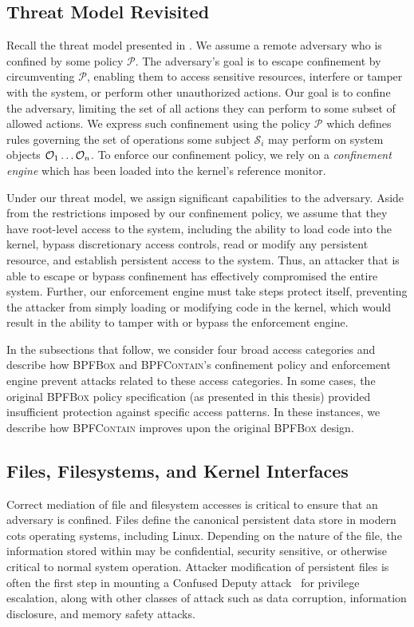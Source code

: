 \documentclass[
  fontsize=12pt,
  titlepage=firstiscover,
  paper=letter,
oneside,
  cleardoublepage=plain,
  parskip=half-,
  DIV=10,
  parindent,
  appendixprefix,
  chapterprefix,
  listof=totoc,
]{scrbook}
\newcommand{\bpfbox}{\textsc{BPFBox}}
\newcommand{\bpfcontain}{\textsc{BPFContain}}
\begin{document}
\subsection{Threat Model Revisited}

Recall the threat model presented in . We assume a remote
adversary who is confined by some policy $\mathcal{P}$. The adversary's goal is to escape
confinement by circumventing $\mathcal{P}$, enabling them to access sensitive resources,
interfere or tamper with the system, or perform other unauthorized actions. Our goal is to
confine the adversary, limiting the set of all actions they can perform to some subset of
allowed actions. We express such confinement using the policy $\mathcal{P}$ which defines
rules governing the set of operations some subject $\mathcal{S}_i$ may perform on system
objects $\mathcal{O}_1 \mathellipsis \mathcal{O}_n$. To enforce our confinement policy, we
rely on a \textit{confinement engine} which has been loaded into the kernel's reference
monitor.

Under our threat model, we assign significant capabilities to the adversary. Aside from the
restrictions imposed by our confinement policy, we assume that they have root-level access
to the system, including the ability to load code into the kernel, bypass discretionary
access controls, read or modify any persistent resource, and establish persistent access
to the system. Thus, an attacker that is able to escape or bypass confinement has
effectively compromised the entire system. Further, our enforcement engine must take steps
protect itself, preventing the attacker from simply loading or modifying code in the
kernel, which would result in the ability to tamper with or bypass the enforcement engine.

In the subsections that follow, we consider four broad access categories and describe how
\bpfbox{} and \bpfcontain{}'s confinement policy and enforcement engine prevent attacks
related to these access categories. In some cases, the original \bpfbox{} policy
specification (as presented in this thesis) provided insufficient protection against
specific access patterns. In these instances, we describe how \bpfcontain{} improves upon
the original \bpfbox{} design.

\subsection{Files, Filesystems, and Kernel Interfaces}

Correct mediation of file and filesystem accesses is critical to ensure that an adversary
is confined. Files define the canonical persistent data store in modern \gls{cots}
operating systems, including Linux. Depending on the nature of the file, the information
stored within may be confidential, security sensitive, or otherwise critical to normal
system operation. Attacker modification of persistent files is often the first step in
mounting a Confused Deputy attack~\cite{hardy1988_confused_deputy} for privilege
escalation, along with other classes of attack such as data corruption, information
disclosure, and memory safety attacks.
\end{document}
